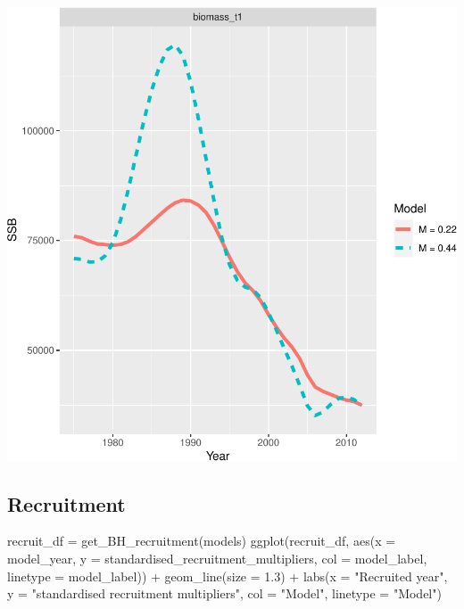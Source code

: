 \documentclass[
]{book}
\newenvironment{Shaded}{\begin{snugshade}}{\end{snugshade}}
\newcommand{\AttributeTok}[1]{\textcolor[rgb]{0.77,0.63,0.00}{#1}}
\newcommand{\FloatTok}[1]{\textcolor[rgb]{0.00,0.00,0.81}{#1}}
\newcommand{\FunctionTok}[1]{\textcolor[rgb]{0.00,0.00,0.00}{#1}}
\newcommand{\NormalTok}[1]{#1}
\newcommand{\OtherTok}[1]{\textcolor[rgb]{0.56,0.35,0.01}{#1}}
\newcommand{\SpecialCharTok}[1]{\textcolor[rgb]{0.00,0.00,0.00}{#1}}
\newcommand{\StringTok}[1]{\textcolor[rgb]{0.31,0.60,0.02}{#1}}
\begin{document}
\includegraphics{_main_files/figure-latex/compare_dqs-1.pdf}

\hypertarget{recruitment}{%
\subsection{Recruitment}\label{recruitment}}

\begin{Shaded}
\begin{Highlighting}[]
\NormalTok{recruit\_df }\OtherTok{=} \FunctionTok{get\_BH\_recruitment}\NormalTok{(models)}
\FunctionTok{ggplot}\NormalTok{(recruit\_df, }\FunctionTok{aes}\NormalTok{(}\AttributeTok{x =}\NormalTok{ model\_year, }\AttributeTok{y =}\NormalTok{ standardised\_recruitment\_multipliers, }\AttributeTok{col =}\NormalTok{ model\_label, }\AttributeTok{linetype =}\NormalTok{ model\_label)) }\SpecialCharTok{+}
  \FunctionTok{geom\_line}\NormalTok{(}\AttributeTok{size =} \FloatTok{1.3}\NormalTok{) }\SpecialCharTok{+}
  \FunctionTok{labs}\NormalTok{(}\AttributeTok{x =} \StringTok{"Recruited year"}\NormalTok{, }\AttributeTok{y =} \StringTok{"standardised recruitment multipliers"}\NormalTok{, }\AttributeTok{col =} \StringTok{"Model"}\NormalTok{, }\AttributeTok{linetype =} \StringTok{"Model"}\NormalTok{)}
\end{Highlighting}
\end{Shaded}
\end{document}
